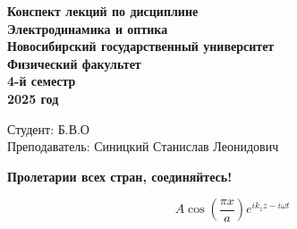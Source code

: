 \documentclass[12pt, a4paper,oneside]{book}
\begin{document}
\begin{titlepage}
    \thispagestyle{empty}  %
    \centering
    \vspace*{1cm}  %

    \textbf{\huge Конспект лекций по дисциплине}  \\[1.5cm]  %
    \textbf{\huge Электродинамика и оптика }  \\[2cm]   %
    \textbf{\Large Новосибирский государственный университет} \\[0.5cm]
    \textbf{\large Физический факультет} \\[0.5cm]
    \textbf{\large 4-й семестр} \\[0.5cm]
    \textbf{\large 2025 год} \\[10cm]

    \begin{flushright}
        \large Студент: Б.В.О \\[0.5cm]  %
        Преподаватель: Синицкий Станислав Леонидович  %
    \end{flushright}
\end{titlepage}

\tableofcontents  %

\def\mainfile{}  %










\vfill
\begin{center}
    \textbf{Пролетарии всех стран, соединяйтесь!}
\end{center}
\vfil

\[ A \cos (\frac{\pi x }{a} ) e^{i k_z z - i  \omega t}  \] 
\end{document}

